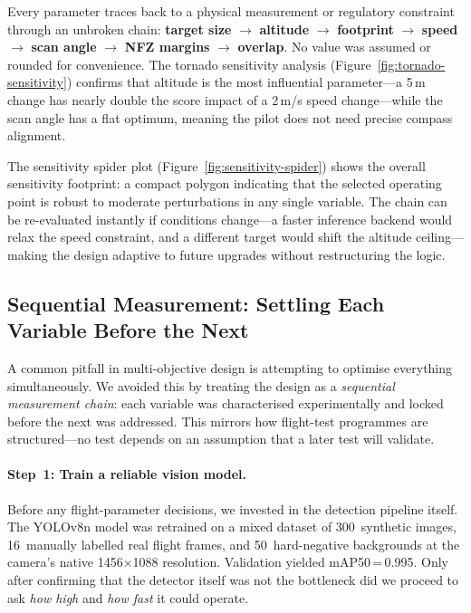 Every parameter traces back to a physical measurement or regulatory constraint through an unbroken chain: \textbf{target size} $\to$ \textbf{altitude} $\to$ \textbf{footprint} $\to$ \textbf{speed} $\to$ \textbf{scan angle} $\to$ \textbf{NFZ margins} $\to$ \textbf{overlap}. No value was assumed or rounded for convenience. The tornado sensitivity analysis (Figure~\ref{fig:tornado-sensitivity}) confirms that altitude is the most influential parameter---a 5\,m change has nearly double the score impact of a 2\,m/s speed change---while the scan angle has a flat optimum, meaning the pilot does not need precise compass alignment.

The sensitivity spider plot (Figure~\ref{fig:sensitivity-spider}) shows the overall sensitivity footprint: a compact polygon indicating that the selected operating point is robust to moderate perturbations in any single variable. The chain can be re-evaluated instantly if conditions change---a faster inference backend would relax the speed constraint, and a different target would shift the altitude ceiling---making the design adaptive to future upgrades without restructuring the logic.

\subsection{Sequential Measurement: Settling Each Variable Before the Next}\label{sec:df-sequential}

A common pitfall in multi-objective design is attempting to optimise everything simultaneously. We avoided this by treating the design as a \emph{sequential measurement chain}: each variable was characterised experimentally and locked before the next was addressed. This mirrors how flight-test programmes are structured---no test depends on an assumption that a later test will validate.

\paragraph{Step~1: Train a reliable vision model.}
Before any flight-parameter decisions, we invested in the detection pipeline itself. The YOLOv8n model was retrained on a mixed dataset of 300~synthetic images, 16~manually labelled real flight frames, and 50~hard-negative backgrounds at the camera's native 1456$\times$1088 resolution. Validation yielded mAP50\,=\,0.995. Only after confirming that the detector itself was not the bottleneck did we proceed to ask \emph{how high} and \emph{how fast} it could operate.

